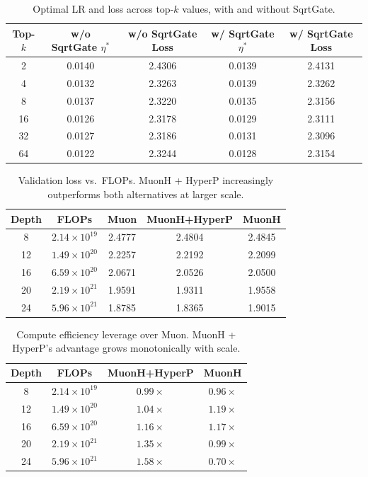 \documentclass{article}
\begin{document}
\begin{table}[H]
\centering
\caption{Optimal LR and loss across top-$k$ values, with and without SqrtGate.}
\label{tab:topk}
\vspace{0.1cm}
\begin{tabular}{ccccc}
\toprule
\textbf{Top-$k$} & \textbf{w/o SqrtGate $\eta^*$} & \textbf{w/o SqrtGate Loss} & \textbf{w/ SqrtGate $\eta^*$} & \textbf{w/ SqrtGate Loss} \\
\midrule
2  & 0.0140 & 2.4306 & 0.0139 & 2.4131 \\
4  & 0.0132 & 2.3263 & 0.0139 & 2.3262 \\
8  & 0.0137 & 2.3220 & 0.0135 & 2.3156 \\
16 & 0.0126 & 2.3178 & 0.0129 & 2.3111 \\
32 & 0.0127 & 2.3186 & 0.0131 & 2.3096 \\
64 & 0.0122 & 2.3244 & 0.0128 & 2.3154 \\
\bottomrule
\end{tabular}
\end{table}




\begin{table}[H]
\centering
\caption{Validation loss vs.\ FLOPs. MuonH + HyperP increasingly outperforms both alternatives at larger scale.}
\label{tab:flops-scaling}
\vspace{0.1cm}
\begin{tabular}{ccccc}
\toprule
\textbf{Depth} & \textbf{FLOPs} & \textbf{Muon} & \textbf{MuonH+HyperP} & \textbf{MuonH } \\
\midrule
8  & $2.14\times10^{19}$ & 2.4777 & 2.4804 & 2.4845 \\
12 & $1.49\times10^{20}$ & 2.2257 & 2.2192 & 2.2099 \\
16 & $6.59\times10^{20}$ & 2.0671 & 2.0526 & 2.0500 \\
20 & $2.19\times10^{21}$ & 1.9591 & 1.9311 & 1.9558 \\
24 & $5.96\times10^{21}$ & 1.8785 & 1.8365 & 1.9015 \\
\bottomrule
\end{tabular}
\end{table}

\begin{table}[H]
\centering
\caption{Compute efficiency leverage over Muon. MuonH + HyperP's advantage grows monotonically with scale.}
\label{tab:leverage}
\vspace{0.1cm}
\begin{tabular}{cccc}
\toprule
\textbf{Depth} & \textbf{FLOPs} & \textbf{MuonH+HyperP} & \textbf{MuonH } \\
\midrule
8  & $2.14\times10^{19}$ & $0.99\times$ & $0.96\times$ \\
12 & $1.49\times10^{20}$ & $1.04\times$ & $1.19\times$ \\
16 & $6.59\times10^{20}$ & $1.16\times$ & $1.17\times$ \\
20 & $2.19\times10^{21}$ & $1.35\times$ & $0.99\times$ \\
24 & $5.96\times10^{21}$ & $1.58\times$ & $0.70\times$ \\
\bottomrule
\end{tabular}
\end{table}
\end{document}
